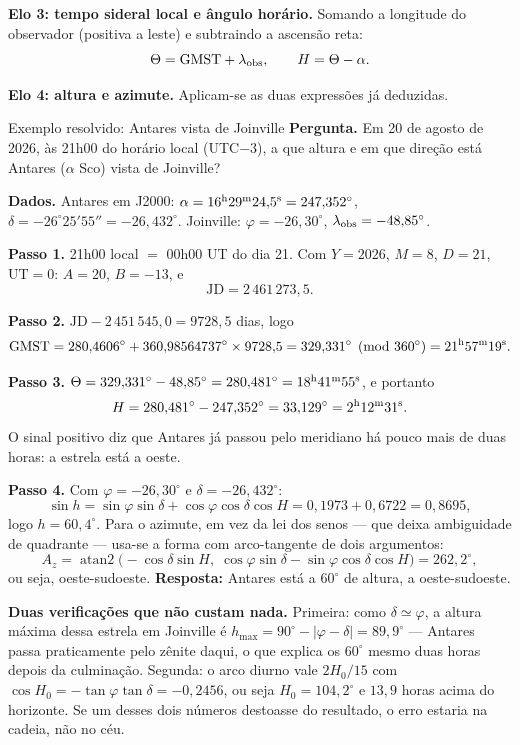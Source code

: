 \documentclass[11pt,a4paper]{article}
\begin{document}
\textbf{Elo 3: tempo sideral local e ângulo horário.} Somando a longitude do observador
(positiva a leste) e subtraindo a ascensão reta:
\[
\Theta=\mathrm{GMST}+\lambda_{\rm obs},\qquad H=\Theta-\alpha.
\]

\textbf{Elo 4: altura e azimute.} Aplicam-se as duas expressões já deduzidas.

\begin{lessonblock}{Exemplo resolvido: Antares vista de Joinville}
\textbf{Pergunta.} Em 20 de agosto de 2026, às 21h00 do horário local (UTC$-3$), a que
altura e em que direção está Antares ($\alpha$ Sco) vista de Joinville?

\textbf{Dados.} Antares em J2000: $\alpha=16^{\rm h}29^{\rm m}24{,}5^{\rm s}=247{,}352^\circ$,
$\delta=-26^\circ25'55''=-26{,}432^\circ$. Joinville: $\varphi=-26{,}30^\circ$,
$\lambda_{\rm obs}=-48{,}85^\circ$.

\textbf{Passo 1.} 21h00 local $=$ 00h00 UT do dia 21. Com $Y=2026$, $M=8$, $D=21$,
$\mathrm{UT}=0$: $A=20$, $B=-13$, e
\[
\mathrm{JD}=2\,461\,273{,}5.
\]

\textbf{Passo 2.} $\mathrm{JD}-2\,451\,545{,}0=9728{,}5$ dias, logo
\[
\mathrm{GMST}=280{,}4606^\circ+360{,}98564737^\circ\times9728{,}5
=329{,}331^\circ \pmod{360^\circ}=21^{\rm h}57^{\rm m}19^{\rm s}.
\]

\textbf{Passo 3.} $\Theta=329{,}331^\circ-48{,}85^\circ=280{,}481^\circ=18^{\rm h}41^{\rm m}55^{\rm s}$,
e portanto
\[
H=280{,}481^\circ-247{,}352^\circ=33{,}129^\circ=2^{\rm h}12^{\rm m}31^{\rm s}.
\]
O sinal positivo diz que Antares já passou pelo meridiano há pouco mais de duas horas: a
estrela está a oeste.

\textbf{Passo 4.} Com $\varphi=-26{,}30^\circ$ e $\delta=-26{,}432^\circ$:
\[
\sin h=\sin\varphi\sin\delta+\cos\varphi\cos\delta\cos H
=0{,}1973+0{,}6722=0{,}8695,
\]
logo $h=60{,}4^\circ$. Para o azimute, em vez da lei dos senos --- que deixa ambiguidade
de quadrante --- usa-se a forma com arco-tangente de dois argumentos:
\[
A_z=\operatorname{atan2}\big(-\cos\delta\sin H,\;
\cos\varphi\sin\delta-\sin\varphi\cos\delta\cos H\big)
=262{,}2^\circ,
\]
ou seja, oeste-sudoeste. \textbf{Resposta:} Antares está a $60^\circ$ de altura, a
oeste-sudoeste.

\textbf{Duas verificações que não custam nada.} Primeira: como
$\delta\simeq\varphi$, a altura máxima dessa estrela em Joinville é
$h_{\max}=90^\circ-|\varphi-\delta|=89{,}9^\circ$ --- Antares passa praticamente pelo
zênite daqui, o que explica os $60^\circ$ mesmo duas horas depois da culminação. Segunda:
o arco diurno vale $2H_0/15$ com $\cos H_0=-\tan\varphi\tan\delta=-0{,}2456$, ou seja
$H_0=104{,}2^\circ$ e $13{,}9$ horas acima do horizonte. Se um desses dois números
destoasse do resultado, o erro estaria na cadeia, não no céu.
\end{lessonblock}
\end{document}
